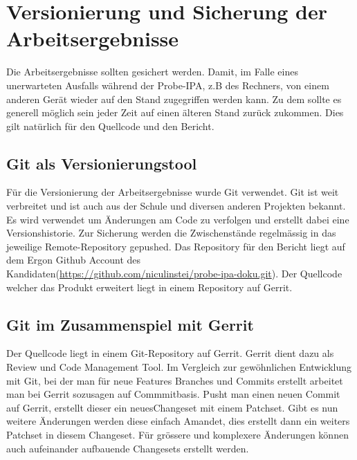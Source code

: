 \chapter{Versionierung und Sicherung der Arbeitsergebnisse}\label{ch:versionierung-und-sicherung-der-arbeitsergebnisse}

Die Arbeitsergebnisse sollten gesichert werden. Damit, im Falle eines unerwarteten Ausfalls während der Probe-IPA, z.B des Rechners, von einem anderen Gerät wieder auf den Stand zugegriffen werden kann. Zu dem sollte es generell möglich sein jeder Zeit auf einen älteren Stand zurück zukommen. Dies gilt natürlich für den Quellcode und den Bericht.

\section{Git als Versionierungstool}
Für die Versionierung der Arbeitsergebnisse wurde Git verwendet. 
Git ist weit verbreitet und ist auch aus der Schule und diversen anderen Projekten bekannt. Es wird verwendet um Änderungen am Code zu verfolgen und erstellt dabei eine Versionshistorie. \newline Zur Sicherung werden die Zwischenstände regelmässig in das jeweilige Remote-Repository gepushed.
Das Repository für den Bericht liegt auf dem Ergon Github Account des Kandidaten(\url{https://github.com/niculinstei/probe-ipa-doku.git}).
Der Quellcode welcher das Produkt erweitert liegt in einem Repository auf Gerrit.

\section{Git im Zusammenspiel mit Gerrit}
Der Quellcode liegt in einem Git-Repository auf Gerrit. Gerrit dient dazu als Review und Code Management Tool. 
Im Vergleich zur \flqq gewöhnlichen\frqq{}  Entwicklung mit Git, bei der man für neue Features Branches und Commits erstellt arbeitet man bei Gerrit sozusagen auf Commmitbasis. 
Pusht man einen neuen Commit auf Gerrit, erstellt dieser ein neues\flqq Changeset\frqq{}  mit einem Patchset. Gibt es nun weitere Änderungen werden diese einfach Amandet, dies erstellt dann ein weiters Patchset in diesem Changeset. Für grössere und komplexere Änderungen können auch aufeinander aufbauende Changesets erstellt werden. 

